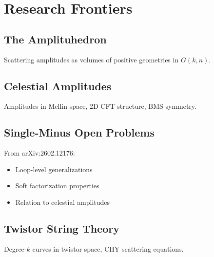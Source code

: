 
\chapter{Research Frontiers}
\label{ch:open}

\section{The Amplituhedron}

Scattering amplitudes as volumes of positive geometries in $G(k,n)$.

\section{Celestial Amplitudes}

Amplitudes in Mellin space, 2D CFT structure, BMS symmetry.

\section{Single-Minus Open Problems}

From arXiv:2602.12176:
\begin{itemize}
\item Loop-level generalizations
\item Soft factorization properties
\item Relation to celestial amplitudes
\end{itemize}

\section{Twistor String Theory}

Degree-$k$ curves in twistor space, CHY scattering equations.
